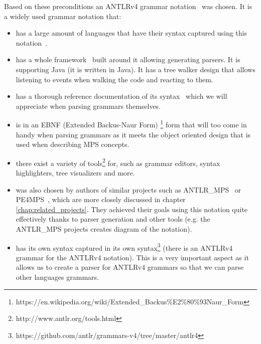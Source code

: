 Based on these preconditions an ANTLRv4 grammar notation~\cite{ANTLR4reference} was chosen. It is a widely used grammar notation that:

\begin{itemize}
	\item has a large amount of languages that have their syntax captured using this notation~\cite{ANTLR4grammars}.

	\item has a whole framework~\cite{ANTLR4} built around it allowing generating parsers. It is supporting Java (it is written in Java). It has a tree walker design that allows listening to events when walking the code and reacting to them.

	\item has a thorough reference documentation of its syntax~\cite{ANTLR4reference} which we will appreciate when parsing grammars themselves.
	
	\item is in an EBNF (Extended Backus-Naur Form) \footnote{https://en.wikipedia.org/wiki/Extended{\_}Backus\%E2\%80\%93Naur{\_}Form} form that will too come in handy when parsing grammars as it meets the object oriented design that is used when describing MPS concepts.
	
	\item there exist a variety of tools\footnote{http://www.antlr.org/tools.html} for, such as grammar editors, syntax highlighters, tree visualizers and more.
	
	\item was also chosen by authors of similar projects such as ANTLR{\_}MPS~\cite{ANTLR2MPS} or PE4MPS~\cite{PE4MPS}, which are more closely discussed in chapter \ref{chap:related_projects}. They achieved their goals using this notation quite effectively thanks to parser generation and other tools (e.g. the ANTLR{\_}MPS projects creates diagram of the notation).
	
	\item has its own syntax captured in its own syntax\footnote{https://github.com/antlr/grammars-v4/tree/master/antlr4} (there is an ANTLRv4 grammar for the ANTLRv4 notation). This is a very important aspect as it allows us to create a parser for ANTLRv4 grammars so that we can parse other languages grammars.
\end{itemize}